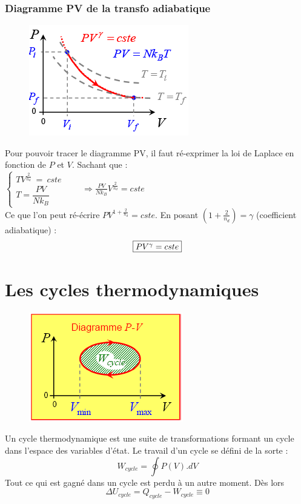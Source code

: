 \documentclass	[11pt, a4paper, openany]{book}
\begin{document}
\subsubsection{Diagramme PV de la transfo adiabatique}
\begin{figure}
	\includegraphics[scale=0.44]{th/image14.png}
\end{figure}
Pour pouvoir tracer le diagramme PV, il faut ré-exprimer la loi de Laplace en fonction de $P$ et $V$. Sachant que : \\
$\left\{\begin{array}{l}
TV^{\frac{2}{n_d}}\ =\ cste\\
T = \dfrac{PV}{Nk_B}
\end{array}\right.$\ \ \ \ $\Rightarrow \frac{PV}{Nk_B}V^{\frac{2}{n_d}} = cste$\\
Ce que l'on peut ré-écrire $PV^{1 + \frac{2}{n_d}} = cste$. En posant $(1 + \frac{2}{n_d}) = \gamma$ (coefficient adiabatique) :
\begin{equation}
	\fbox{$PV^\gamma = cste$}
\end{equation}
\newpage
\section{Les cycles thermodynamiques}
\begin{figure}
	\includegraphics[scale=0.44]{th/image15.png}
\end{figure}
Un cycle thermodynamique est une suite de transformations formant un cycle dans l'espace des variables d'état. Le travail d'un cycle se défini de la sorte :
\begin{equation}
	W_{cycle} = \oint P(V).dV
\end{equation}
Tout ce qui est gagné dans un cycle est perdu à un autre moment. Dès lors 
\begin{equation}
	\Delta U_{cycle} = Q_{cycle} - W_{cycle} \equiv 0
\end{equation}
\end{document}
